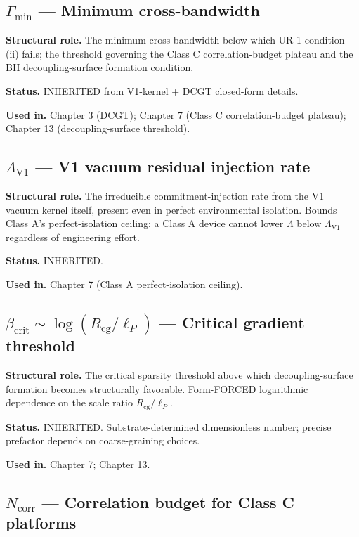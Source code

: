 \documentclass[11pt]{book}
\begin{document}
\subsection{$\Gamma_\mathrm{min}$ — Minimum cross-bandwidth}

\textbf{Structural role.} The minimum cross-bandwidth below which UR-1 condition (ii) fails; the threshold governing the Class C correlation-budget plateau and the BH decoupling-surface formation condition.

\textbf{Status.} INHERITED from V1-kernel + DCGT closed-form details.

\textbf{Used in.} Chapter 3 (DCGT); Chapter 7 (Class C correlation-budget plateau); Chapter 13 (decoupling-surface threshold).

\subsection{$\Lambda_\mathrm{V1}$ — V1 vacuum residual injection rate}

\textbf{Structural role.} The irreducible commitment-injection rate from the V1 vacuum kernel itself, present even in perfect environmental isolation. Bounds Class A's perfect-isolation ceiling: a Class A device cannot lower $\Lambda$ below $\Lambda_\mathrm{V1}$ regardless of engineering effort.

\textbf{Status.} INHERITED.

\textbf{Used in.} Chapter 7 (Class A perfect-isolation ceiling).

\subsection{$\beta_\mathrm{crit} \sim \log(R_\mathrm{cg}/\ell_P)$ — Critical gradient threshold}

\textbf{Structural role.} The critical sparsity threshold above which decoupling-surface formation becomes structurally favorable. Form-FORCED logarithmic dependence on the scale ratio $R_\mathrm{cg}/\ell_P$.

\textbf{Status.} INHERITED. Substrate-determined dimensionless number; precise prefactor depends on coarse-graining choices.

\textbf{Used in.} Chapter 7; Chapter 13.

\subsection{$N_\mathrm{corr}$ — Correlation budget for Class C platforms}
\end{document}
